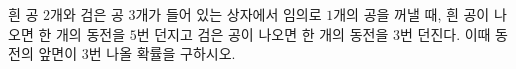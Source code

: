 흰 공 $2$개와 검은 공 $3$개가 들어 있는 상자에서 임의로 $1$개의 공을 꺼낼 때, 흰 공이 나오면 한 개의 동전을 $5$번 던지고 검은 공이 나오면 한 개의 동전을 $3$번 던진다. 이때 동전의 앞면이 $3$번 나올 확률을 구하시오.
